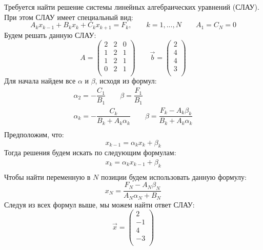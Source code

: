 \documentclass[14pt, a4paper, fleqn]{extarticle}
\begin{document}
	\tableofcontents
	\pagebreak
	Требуется найти решение системы линейных алгебраических уравнений (СЛАУ). При этом СЛАУ имеет специальный вид:
	\[
	A_kx_{k-1} + B_kx_k + C_kx_{k+1} = F_k, \qquad k = 1,...,N  \qquad A_1 = C_N = 0
	\]
	Будем решать данную СЛАУ:
	\[
	A = \begin{pmatrix}
		2 & 2 & 0  \\
		1 & 2 & 1  \\
		1 & 2 & 1  \\
		0 & 2 & 1  \\
	\end{pmatrix} \qquad
	\vec{b} = \begin{pmatrix}
		2 \\
		4 \\
		4 \\
		3 \\
	\end{pmatrix}
	\]
	Для начала найдем все $\alpha$ и $\beta$, исходя из формул:
	\begin{multline*}
		\alpha_2 = -\dfrac{C_1}{B_1} \qquad \beta = \dfrac{F_1}{B_1} \\
		\alpha_k = - \dfrac{C_k}{B_k + A_k\alpha_k} \qquad \beta = \dfrac{F_k - A_k\beta_k}{B_k + A_k\alpha_k}\\
	\end{multline*}
	Предположим, что:
	\[
	x_{k-1} = \alpha_kx_k + \beta_k
	\]
	Тогда решения будем искать по следующим формулам:
	\begin{multline*}
		x_k = \alpha_kx_{k-1} + \beta_k \\
	\end{multline*}
	Чтобы найти переменную в $N$ позиции будем использовать данную формулу:
	\[
	x_N = \dfrac{F_N - A_N\beta_N}{A_N\alpha_N + B_N}
	\]
	Следуя из всех формул выше, мы можем найти ответ СЛАУ:
	\[
	\vec{x} = 
	\begin{pmatrix}
		2\\
		-1\\
		4\\
		-3\\
	\end{pmatrix}
	\]
\end{document}
